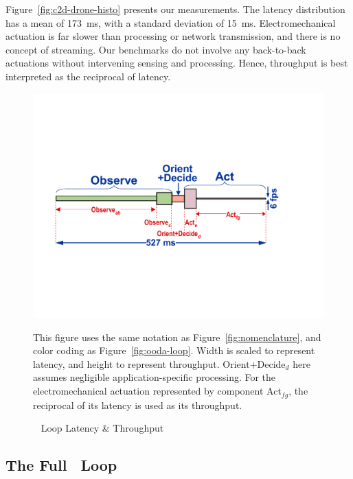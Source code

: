 \endgroup

Figure~\ref{fig:c2d-drone-histo} presents our measurements.  The
latency distribution has a mean of 173~ms, with a standard deviation
of 15~ms.  Electromechanical actuation is far slower than processing
or network transmission, and there is no concept of streaming.  Our
benchmarks do not involve any back-to-back actuations without
intervening sensing and processing. Hence, throughput is best
interpreted as the reciprocal of latency.


\begin{figure}
\includegraphics[width=1.0\linewidth]{FIGS/fig-ooda-scaling.pdf}
\begin{captext}
  This figure uses the same notation as Figure~\ref{fig:nomenclature},
  and color coding as Figure~\ref{fig:ooda-loop}.  Width is scaled to
  represent latency, and height to represent throughput.
  Orient+Decide$_d$ here assumes negligible application-specific
  processing.  For the electromechanical actuation represented by
  component Act$_{fg}$, the reciprocal of its latency is used as its
  throughput.
\end{captext}
\vspace{-0.1in}
\caption{\small \ooda~ Loop Latency \& Throughput}
\label{fig:ooda-scaling}
\vspace{-0.1in}
\end{figure}

\subsection{The Full \ooda~Loop}
\label{sec:e2e-discussion}

